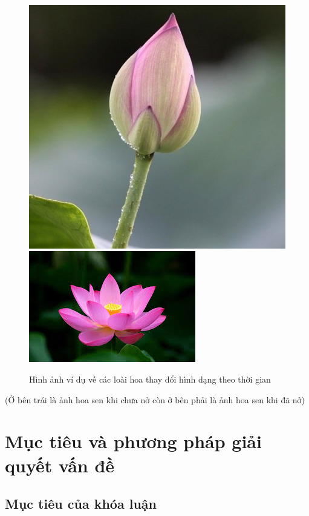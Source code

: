 \documentclass[12pt]{report}
\begin{document}
		\begin{figure}[h]
			\centering
			\includegraphics[scale=0.4]{anh_5}
			\includegraphics[scale=0.9]{anh_6}
			\caption{Hình ảnh ví dụ về các loài hoa thay đổi hình dạng theo thời gian}
			\label{fig:anh_2}
		\end{figure}
		(Ở bên trái là ảnh hoa sen khi chưa nở còn ở bên phải là ảnh hoa sen khi đã nở)
																																																																						
		\section{Mục tiêu và phương pháp giải quyết vấn đề}
		\subsection{Mục tiêu của khóa luận}
																																																																				
\end{document}

